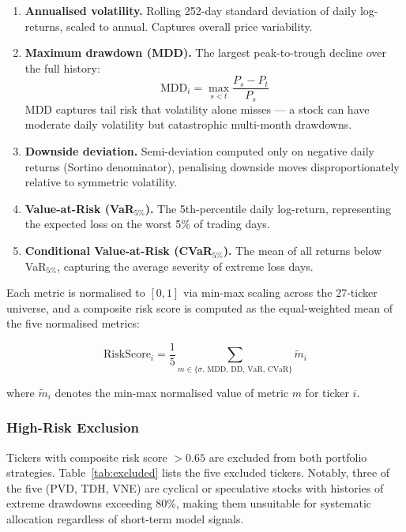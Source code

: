 \documentclass[12pt, a4paper]{article}
\begin{document}
\begin{enumerate}
  \item \textbf{Annualised volatility.} Rolling 252-day standard
    deviation of daily log-returns, scaled to annual. Captures
    overall price variability.
  \item \textbf{Maximum drawdown (MDD).} The largest peak-to-trough
    decline over the full history:
    \begin{equation}
      \text{MDD}_i = \max_{s < t} \frac{P_s - P_t}{P_s}
    \end{equation}
    MDD captures tail risk that volatility alone misses --- a stock
    can have moderate daily volatility but catastrophic multi-month
    drawdowns.
  \item \textbf{Downside deviation.} Semi-deviation computed only on
    negative daily returns (Sortino denominator), penalising downside
    moves disproportionately relative to symmetric volatility.
  \item \textbf{Value-at-Risk (VaR$_{5\%}$).} The 5th-percentile
    daily log-return, representing the expected loss on the worst
    5\% of trading days.
  \item \textbf{Conditional Value-at-Risk (CVaR$_{5\%}$).} The mean
    of all returns below VaR$_{5\%}$, capturing the average severity
    of extreme loss days.
\end{enumerate}

Each metric is normalised to $[0,1]$ via min-max scaling across the
27-ticker universe, and a composite risk score is computed as the
equal-weighted mean of the five normalised metrics:

\begin{equation}
\text{RiskScore}_i = \frac{1}{5}
  \sum_{m \in \{\sigma,\, \text{MDD},\, \text{DD},\, \text{VaR},\, \text{CVaR}\}}
  \widetilde{m}_i
\label{eq:risk_score}
\end{equation}

where $\widetilde{m}_i$ denotes the min-max normalised value of
metric $m$ for ticker $i$.

\subsubsection{High-Risk Exclusion}

Tickers with composite risk score $> 0.65$ are excluded from both
portfolio strategies. Table~\ref{tab:excluded} lists the five
excluded tickers. Notably, three of the five (PVD, TDH, VNE) are
cyclical or speculative stocks with histories of extreme drawdowns
exceeding 80\%, making them unsuitable for systematic allocation
regardless of short-term model signals.
\end{document}
